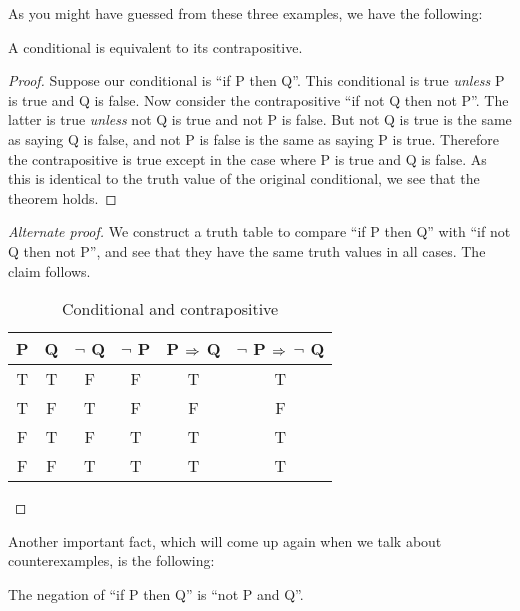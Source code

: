 \documentclass{tufte-book}
\begin{document}
As you might have guessed from these three examples, we have the following:
\begin{theorem}
  A conditional is equivalent to its contrapositive.
\end{theorem}

\begin{proof}
  Suppose our conditional is ``if P then Q''. This conditional is true \emph{unless} P is true and Q is false. Now consider the contrapositive ``if not Q then not P''. The latter is true \emph{unless} not Q is true and not P is false. But not Q is true is the same as saying Q is false, and not P is false is the same as saying P is true. Therefore the contrapositive is true except in the case where P is true and Q is false. As this is identical to the truth value of the original conditional, we see that the theorem holds.
\end{proof}

\begin{proof}[Alternate proof] 
  We construct a truth table to compare ``if P then Q'' with ``if not Q then not P'', and see that they have the same truth values in all cases. The claim follows.

  \begin{table}
    \centering
    \begin{tabular}{cccccc}
      \toprule
      P & Q & $\neg$ Q & $\neg$ P & P $\Rightarrow$ Q & $\neg$ P $\Rightarrow$ $\neg$ Q \\ \midrule 
      T & T & F & F & T & T \\
      T & F & T & F & F & F \\
      F & T & F & T & T & T \\
      F & F & T & T & T & T \\
      \bottomrule
    \end{tabular}
    \caption{Conditional and contrapositive}
    \label{tab:conditional-contrapositive}
  \end{table}
\end{proof}

Another important fact, which will come up again when we talk about counterexamples, is the following:
\begin{theorem}\label{thm:negation-conditional}
  The negation of ``if P then Q'' is ``not P and Q''.
\end{theorem}
\end{document}
